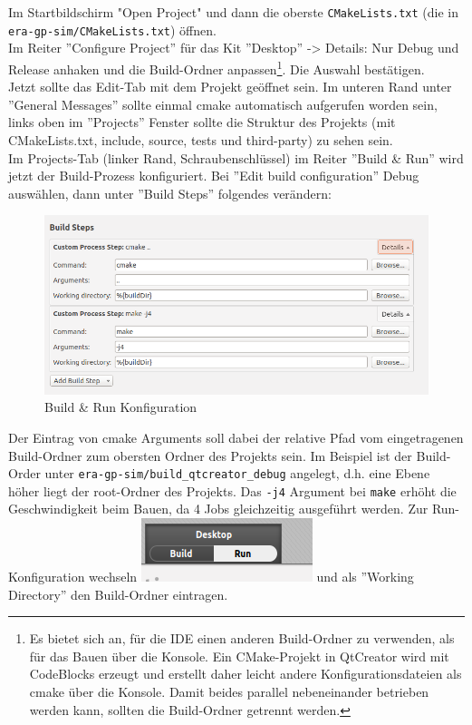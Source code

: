 Im Startbildschirm "Open Project" und dann die oberste \texttt{CMakeLists.txt}
(die in \texttt{era-gp-sim/CMakeLists.txt}) öffnen.\\ Im Reiter ''Configure
Project'' für das Kit ''Desktop'' -> Details: Nur Debug und Release anhaken und
die Build-Ordner anpassen\footnote{Es bietet sich an, für die IDE einen anderen
Build-Ordner zu verwenden, als für das Bauen über die Konsole. Ein CMake-Projekt
in QtCreator wird mit CodeBlocks erzeugt und erstellt daher leicht andere
Konfigurationsdateien als cmake über die Konsole. Damit beides parallel
nebeneinander betrieben werden kann, sollten die Build-Ordner getrennt werden.}.
Die Auswahl bestätigen.\\ Jetzt sollte das Edit-Tab mit dem Projekt geöffnet
sein. Im unteren Rand unter ''General Messages'' sollte einmal cmake automatisch
aufgerufen worden sein, links oben im ''Projects'' Fenster sollte die Struktur
des Projekts (mit CMakeLists.txt, include, source, tests und third-party) zu
sehen sein.\\ Im Projects-Tab (linker Rand, Schraubenschlüssel) im Reiter
''Build \& Run'' wird jetzt der Build-Prozess konfiguriert. Bei ''Edit build
configuration'' Debug auswählen, dann unter ''Build Steps'' folgendes
verändern:\\
\begin{figure}[H]
	\centering
	\includegraphics[scale=0.5]{images/setup-qtcreator-buildrun-config.png}
	\caption{Build \& Run Konfiguration}
\end{figure}

Der Eintrag von cmake Arguments soll dabei der relative Pfad vom eingetragenen
Build-Ordner zum obersten Ordner des Projekts sein. Im Beispiel ist der
Build-Order unter \texttt{era-gp-sim/build\_qtcreator\_debug} angelegt, d.h.
eine Ebene höher liegt der root-Ordner des Projekts. Das \texttt{-j4} Argument
bei \texttt{make} erhöht die Geschwindigkeit beim Bauen, da 4 Jobs gleichzeitig
ausgeführt werden. Zur Run-Konfiguration wechseln
\includegraphics[scale=1.0]{images/setup-qtcreator-run-config} und als ''Working
Directory'' den Build-Ordner eintragen.\\

